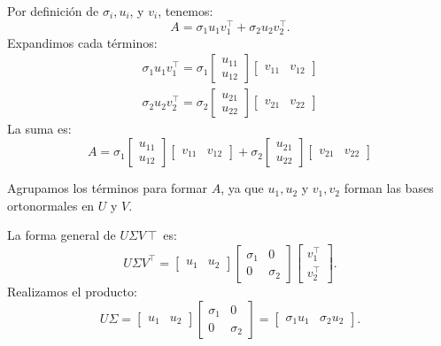 \begin{enumerate}[label=\color{red}\textbf{\arabic*)}]
\begin{enumerate}[label=\color{red}\textbf{\alph*)}]
    Por definición de $\sigma_i,u_i$, y  $v_i$, tenemos:  \[
    A=\sigma_1u_1v_1^\intercal+\sigma_2u_2v_2^\intercal.
    \] 
    Expandimos cada términos: \[
    \begin{array}{c}
        \sigma_1u_1v_1^\intercal=\sigma_1\begin{bmatrix} 
        u_{11}\\u_{12} 
        \end{bmatrix} \begin{bmatrix} 
        v_{11} & v_{12} 
        \end{bmatrix} \\
        \sigma_2u_2v_2^\intercal=\sigma_2\begin{bmatrix} 
        u_{21}\\u_{22} 
        \end{bmatrix} \begin{bmatrix} 
        v_{21} & v_{22} 
        \end{bmatrix} 
    \end{array}
    \] 
    La suma es:
    \[
    A=\sigma_1\begin{bmatrix} 
        u_{11}\\u_{12} 
        \end{bmatrix} \begin{bmatrix} 
        v_{11} & v_{12} 
        \end{bmatrix}+\sigma_2\begin{bmatrix} 
        u_{21}\\u_{22} 
        \end{bmatrix} \begin{bmatrix} 
        v_{21} & v_{22} 
        \end{bmatrix} 
    \] 

    Agrupamos los términos para formar $A$, ya que  $u_1,u_2$ y $v_1,v_2$ forman las bases ortonormales en $U$ y $V$.

    La forma general de $U\Sigma V\intercal$ es: \[
    U\Sigma V^\intercal=\begin{bmatrix} 
        u_1 & u_2 
    \end{bmatrix}\begin{bmatrix} 
        \sigma_1 & 0\\0 & \sigma_2 
    \end{bmatrix} \begin{bmatrix} 
    v_1^\intercal\\ v_2^\intercal 
    \end{bmatrix}  .
    \] 
    Realizamos el producto: \[
    U\Sigma = \begin{bmatrix} 
        u_1 & u_2 
    \end{bmatrix}\begin{bmatrix} 
        \sigma_1 & 0\\0 & \sigma_2 
    \end{bmatrix}  =\begin{bmatrix} 
        \sigma_1u_1 & \sigma_2u_2 
    \end{bmatrix} .
    \] 


\end{enumerate}
\end{enumerate}
